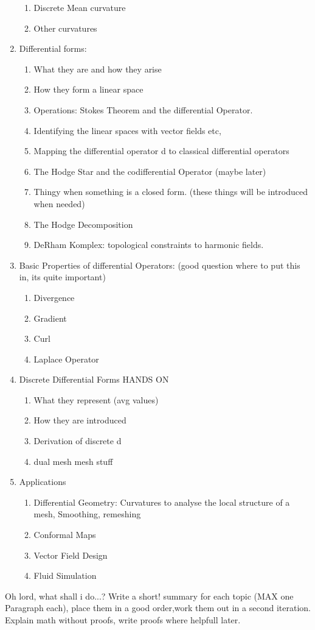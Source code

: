 \begin{enumerate}
\begin{enumerate}
		\item Discrete Mean curvature
		\item Other curvatures
	\end{enumerate}
\item Differential forms:
	\begin{enumerate}
		\item What they are and how they arise
		\item How they form a linear space
		\item Operations: Stokes Theorem and the differential Operator.
		\item Identifying the linear spaces with vector fields etc,
		\item Mapping the differential operator d to classical differential operators
		\item The Hodge Star and the codifferential Operator (maybe later)
		\item Thingy when something is a closed form. (these things will be introduced when needed)
		\item The Hodge Decomposition
		\item DeRham Komplex: topological constraints to harmonic fields.
	\end{enumerate}
\item Basic Properties of differential Operators: (good question where to put this in, its quite important)
	\begin{enumerate}
		\item Divergence
		\item Gradient
		\item Curl
		\item Laplace Operator
	\end{enumerate}
\item Discrete Differential Forms HANDS ON
	\begin{enumerate}
		\item What they represent (avg values)
		\item How they are introduced
		\item Derivation of discrete d 
		\item dual mesh mesh stuff
	\end{enumerate}
\item Applications
	\begin{enumerate}
		\item Differential Geometry: Curvatures to analyse the local structure of a mesh, Smoothing, remeshing
		\item Conformal Maps
		\item Vector Field Design
		\item Fluid Simulation
	\end{enumerate}
\end{enumerate}
Oh lord, what shall i do...? Write a short! summary for each topic (MAX one Paragraph each), place them in a good order,work them out in a second iteration. Explain math without proofs, write proofs where helpfull later.

